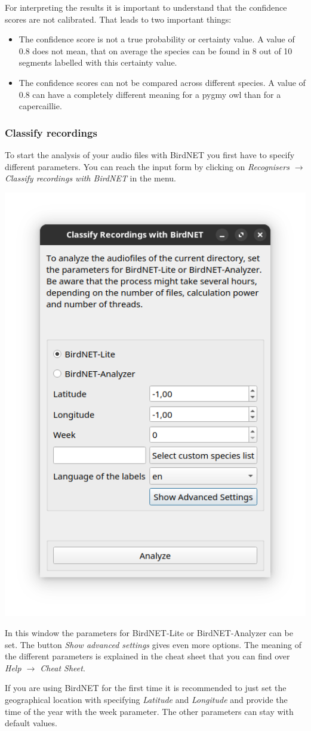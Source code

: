 \documentclass{scrartcl}
\begin{document}
For interpreting the results it is important to understand that the confidence scores are not calibrated. That leads to two important things:
\begin{itemize}
	\item The confidence score is not a true probability or certainty value. A value of 0.8 does not mean, that on average the species can be found in 8 out of 10 segments labelled with this certainty value.
	\item The confidence scores can not be compared across different species. A value of 0.8 can have a completely different meaning for a pygmy owl than for a capercaillie.
\end{itemize}

\subsubsection{Classify recordings}
To start the analysis of your audio files with BirdNET you first have to specify different parameters.
You can reach the input form by clicking on \textit{Recognisers $\rightarrow$ Classify recordings with BirdNET} in the menu.
\begin{center}
	\includegraphics[width=.5\textwidth]{Figures/BirdNET_Settings}
\end{center}

In this window the parameters for BirdNET-Lite or BirdNET-Analyzer can be set.
The button \textit{Show advanced settings} gives even more options.
The meaning of the different parameters is explained in the cheat sheet that you can find over \textit{Help $\rightarrow$ Cheat Sheet}.

If you are using BirdNET for the first time it is recommended to just set the geographical location with specifying \textit{Latitude} and \textit{Longitude} and provide the time of the year with the week parameter.
The other parameters can stay with default values.
\end{document}

